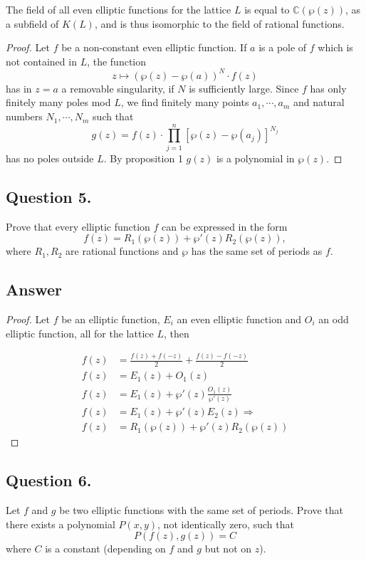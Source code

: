 \begin{proposition}[2]
    The field of all even elliptic functions for the lattice $L$ is equal to $\mathbb{C}(\wp(z))$, as a subfield
    of $K(L)$, and is thus isomorphic to the field of rational functions.
\end{proposition}

\begin{proof}
    Let $f$ be a non-constant even elliptic function. If $a$ is a pole of $f$ which is not contained in $L$, the
    function
    \[
        z \mapsto (\wp(z)-\wp(a))^N \cdot f(z)
    \]
    has in $z=a$ a removable singularity, if $N$ is sufficiently large. Since $f$ has only finitely many poles mod $L$,
    we find finitely many points $a_1, \cdots , a_m$ and natural numbers $N_1, \cdots , N_m$ such that
    \[
        g(z) = f(z) \cdot \prod_{j=1}^{n} [ \wp(z) - \wp(a_j) ]^{N_j}
    \]
    has no poles outside $L$. By proposition 1 $g(z)$ is a polynomial in $\wp(z)$.
\end{proof}


\subsection{Question 5.}
\noindent
Prove that every elliptic function $f$ can be expressed in the form
\[
    f(z) = R_1(\wp(z))+ \wp'(z)R_2(\wp(z)),
\]
where $R_1, R_2$ are rational functions and $\wp$ has the same set of periods as $f$.

\subsection*{Answer}

\begin{proof}
    Let $f$ be an elliptic function, $E_i$ an even elliptic function and $O_i$ an odd elliptic function, all for the
    lattice $L$, then

    \begin{align*}
        f(z) &= \frac{f(z)+f(-z)}{2}+\frac{f(z)-f(-z)}{2} \\
        f(z) &= E_1(z)+O_1(z) \\
        f(z) &= E_1(z)+\wp'(z) \frac{O_1(z)}{\wp'(z)} \\
        f(z) &= E_1(z)+\wp'(z) E_2(z) \Rightarrow \\
        f(z) &= R_1(\wp(z))+ \wp'(z)R_2(\wp(z))
    \end{align*}
\end{proof}


\subsection{Question 6.}
\noindent
Let $f$ and $g$ be two elliptic functions with the same set of periods. Prove that there exists a polynomial $P(x, y)$,
not identically zero, such that
\[
    P(f(z), g(z) )= C
\]
where $C$ is a constant (depending on $f$ and $g$ but not on $z$).

